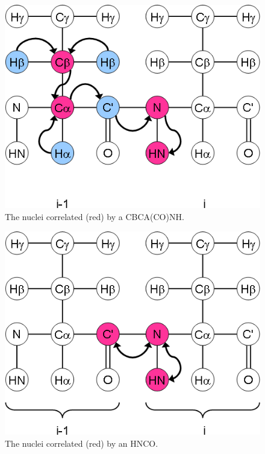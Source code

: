 \begin{figure}
  \includegraphics[scale=0.5]{figures/ccpn_cbcaconh}
  \caption[The nuclei correlated by a CBCA(CO)NH.]
          {The nuclei correlated (red) by a CBCA(CO)NH.}
  \label{ccpn_cbcaconh}
\end{figure}
\begin{figure}
  \includegraphics[scale=0.5]{figures/ccpn_hnco}
  \caption[The nuclei correlated by an HNCO.]
          {The nuclei correlated (red) by an HNCO.}
  \label{ccpn_hnco}
\end{figure}
